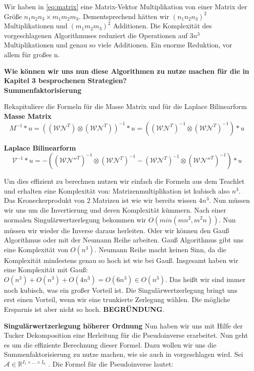  
Wir haben in \ref{eq:matrix} eine Matrix-Vektor Multiplikation von einer Matrix der Größe $n_1 n_2 n_3 \times m_1 m_2 m_3$. Dementsprechend hätten wir $(n_1 n_2 n_3)^{2}$ Multiplikationen und $(m_1 m_2 m_3)^{2}$ Additionen. Die Komplexität des vorgeschlagenen Algorithmuses reduziert die Operationen auf $3n^{3}$ Multiplikationen und genau so viele Additionen.
Ein enorme Reduktion, vor allem für großes n.

\textbf{Wie können wir uns nun diese Algorithmen zu nutze machen für die in Kapitel 3 besprochenen Strategien?} \\

\textbf{Summenfaktorisierung}

Rekapituliere die Formeln für die Masse Matrix und für die Laplace Bilinearform \\
\textbf{Masse Matrix} 
\begin{equation*}
M^{-1}*u = ((\mathcal{W} \mathcal{N}^{T}) \otimes (\mathcal{W} \mathcal{N}^{T}))^{-1}*u
= ((\mathcal{W} \mathcal{N}^{T})^{-1} \otimes (\mathcal{W} \mathcal{N}^{T})^{-1})*u
\end{equation*}

\textbf{Laplace Bilinearform}
\begin{equation*}
\mathcal{V}^{-1}*u =  -((\mathcal{W} \mathcal{N''}^{T})^{-1} \otimes (\mathcal{W} \mathcal{N}^{T})^{-1} - (\mathcal{W} \mathcal{N}^{T})^{-1} \otimes (\mathcal{W} \mathcal{N''}^{T})^{-1})*u
\end{equation*}

Um dies effizient zu berechnen nutzen wir einfach die Formeln aus dem Teachlet und erhalten eine Komplexität von:
Matrizenmultiplikation ist kubisch also $n^3$. Das Kroneckerprodukt von 2 Matrizen ist wie wir bereits wissen $4n^3$. Nun müssen wir uns um die Invertierung und deren Komplexität kümmern. Nach einer normalen Singulärwertzerlegung bekommen wir $O(min(mn^2,m^2 n))$. Nun müssen wir wieder die Inverse daraus herleiten. 
Oder wir können den Gauß Algorithmus oder mit der Neumann Reihe arbeiten. Gauß Algorithmus gibt uns eine Komplexität von $O(n^3)$. Neumann Reihe macht keinen Sinn, da die Komplexität mindestens genau so hoch ist wie bei Gauß.
Insgesamt haben wir eine Komplexität mit Gauß: $O(n^3)+O(n^3)+O(4n^3)=O(6n^3) \in O(n^3)$. Das heißt wir sind immer noch kubisch, was ein großer Vorteil ist.
Die Singulärwertzerlegung bringt uns erst einen Vorteil, wenn wir eine trunkierte Zerlegung wählen. Die mögliche Ersparnis ist aber nicht so hoch. \textbf{BEGRÜNDUNG}.

\textbf{Singulärwertzerlegung höherer Ordnung}
Nun haben wir uns mit Hilfe der Tucker Dekomposition eine Herleitung für die Pseudoinverse erarbeitet. Nun geht es um die effiziente Berechnung dieser Formel. Dazu wollen wir uns die Summenfaktorisierung zu nutze machen, wie sie auch in \cite[9-11]{Teachlet} vorgeschlagen wird.
Sei $\mathcal{A} \in \mathbb{R}^{I_{1} \times \dots \times I_{n}}$ .
Die Formel für die Pseudoinverse lautet:

